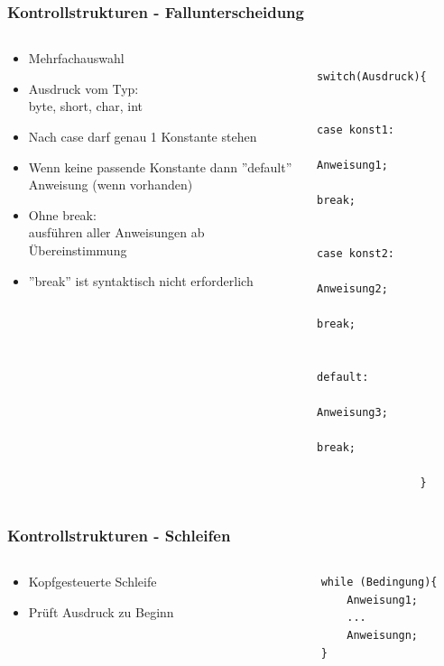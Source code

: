 \begin{frame}[fragile]
	\frametitle{Kontrollstrukturen - Fallunterscheidung}
	\begin{columns}
		\begin{column}{0.5\textwidth}
			\small
			\begin{itemize}
			  \item Mehrfachauswahl
			  \item Ausdruck vom Typ:\\
			  byte, short, char, int
			  \item Nach case darf genau 1 Konstante stehen
			  \item Wenn keine passende Konstante 
			  dann ''default'' Anweisung (wenn vorhanden)
			  \item Ohne break: \\
			  ausf\"uhren aller Anweisungen ab \"Ubereinstimmung
			  \item ''break'' ist syntaktisch nicht erforderlich
			\end{itemize}
		\end{column}
		\begin{column}{0.5\textwidth}
			\begin{lstlisting}
				switch(Ausdruck){
					
					case konst1:
						Anweisung1;
						break;
						
					case konst2:
						Anweisung2;
						break;
						
					default:
						Anweisung3;
						break;
						
				}
			\end{lstlisting}
		\end{column}
	\end{columns}
\end{frame}

\begin{frame}[fragile]
	\frametitle{Kontrollstrukturen - Schleifen}
	\begin{columns}
		\begin{column}{0.5\textwidth}
			\begin{itemize}
			  \item Kopfgesteuerte Schleife
			  \item Pr\"uft Ausdruck zu Beginn 
			\end{itemize}
		\end{column}
		\begin{column}{0.5\textwidth}
			\begin{lstlisting}
				while (Bedingung){
					Anweisung1;
					...
					Anweisungn;
				}
			\end{lstlisting}
		\end{column}
	\end{columns}
\end{frame}

